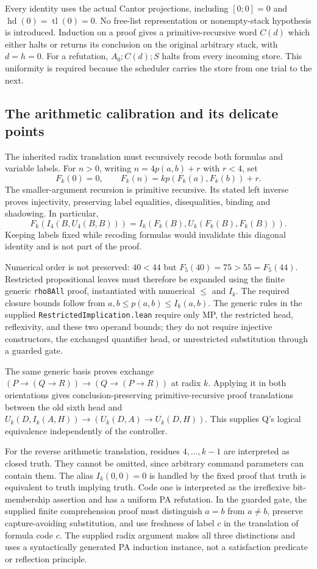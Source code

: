 Every identity uses the actual Cantor projections, including
$[0;0]=0$ and $\operatorname{hd}(0)=\operatorname{tl}(0)=0$.
No free-list representation or nonempty-stack hypothesis is introduced.
Induction on a proof gives a primitive-recursive word $C(d)$ which either
halts or returns its conclusion on the original arbitrary stack, with
$d=h=0$. For a refutation, $A_0;C(d);S$ halts from every incoming store.
This uniformity is required because the scheduler carries the store from
one trial to the next.

\subsection{The arithmetic calibration and its delicate points}
The inherited radix translation must recursively recode both formulas and
variable labels. For $n>0$, writing $n=4p(a,b)+r$ with $r<4$, set
\[
 F_k(0)=0,\qquad F_k(n)=kp(F_k(a),F_k(b))+r.
\]
The smaller-argument recursion is primitive recursive. Its stated left
inverse proves injectivity, preserving label equalities, disequalities,
binding and shadowing. In particular,
\[
 F_k(I_4(B,U_4(B,B)))=I_k(F_k(B),U_k(F_k(B),F_k(B))).
\]
Keeping labels fixed while recoding formulas would invalidate this diagonal
identity and is not part of the proof.

Numerical order is not preserved: $40<44$ but
$F_5(40)=75>55=F_5(44)$. Restricted propositional leaves must therefore be
expanded using the finite generic \texttt{rho8All} proof, instantiated
with numerical $\le$ and $I_k$. The required closure bounds follow from
$a,b\le p(a,b)\le I_k(a,b)$. The generic rules in the supplied
\texttt{RestrictedImplication.lean} require only MP, the restricted head,
reflexivity, and these two operand bounds; they do not require injective
constructors, the exchanged quantifier head, or unrestricted substitution
through a guarded gate.

The same generic basis proves exchange
$(P\to(Q\to R))\to(Q\to(P\to R))$ at radix $k$.
Applying it in both orientations gives conclusion-preserving
primitive-recursive proof translations between the old sixth head and
$U_k(D,I_k(A,H))\to(U_k(D,A)\to U_k(D,H))$.
This supplies Q's logical equivalence independently of the controller.

For the reverse arithmetic translation, residues $4,\ldots,k-1$ are
interpreted as closed truth. They cannot be omitted, since arbitrary
command parameters can contain them. The alias $I_k(0,0)=0$ is handled
by the fixed proof that truth is equivalent to truth implying truth.
Code one is interpreted as the irreflexive bit-membership assertion and
has a uniform PA refutation. In the guarded gate, the supplied finite
comprehension proof must distinguish $a=b$ from $a\ne b$, preserve
capture-avoiding substitution, and use freshness of label $c$ in the
translation of formula code $c$. The supplied radix argument makes all
three distinctions and uses a syntactically generated PA induction
instance, not a satisfaction predicate or reflection principle.

